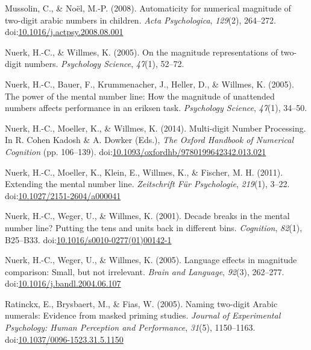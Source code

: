 \documentclass[english,man]{apa6}
\theoremstyle{definition}
\theoremstyle{definition}
\theoremstyle{definition}
\theoremstyle{remark}
\begin{document}
\hypertarget{ref-mussolin2008}{}
Mussolin, C., \& Noël, M.-P. (2008). Automaticity for numerical
magnitude of two-digit arabic numbers in children. \emph{Acta
Psychologica}, \emph{129}(2), 264--272.
doi:\href{https://doi.org/10.1016/j.actpsy.2008.08.001}{10.1016/j.actpsy.2008.08.001}

\hypertarget{ref-nuerk2005}{}
Nuerk, H.-C., \& Willmes, K. (2005). On the magnitude representations of
two-digit numbers. \emph{Psychology Science}, \emph{47}(1), 52--72.

\hypertarget{ref-nuerk2005power}{}
Nuerk, H.-C., Bauer, F., Krummenacher, J., Heller, D., \& Willmes, K.
(2005). The power of the mental number line: How the magnitude of
unattended numbers affects performance in an eriksen task.
\emph{Psychology Science}, \emph{47}(1), 34--50.

\hypertarget{ref-nuerk2014chapter}{}
Nuerk, H.-C., Moeller, K., \& Willmes, K. (2014). Multi-digit Number
Processing. In R. Cohen Kadosh \& A. Dowker (Eds.), \emph{The Oxford
Handbook of Numerical Cognition} (pp. 106--139).
doi:\href{https://doi.org/10.1093/oxfordhb/9780199642342.013.021}{10.1093/oxfordhb/9780199642342.013.021}

\hypertarget{ref-nuerk2011}{}
Nuerk, H.-C., Moeller, K., Klein, E., Willmes, K., \& Fischer, M. H.
(2011). Extending the mental number line. \emph{Zeitschrift Für
Psychologie}, \emph{219}(1), 3--22.
doi:\href{https://doi.org/10.1027/2151-2604/a000041}{10.1027/2151-2604/a000041}

\hypertarget{ref-nuerk2001}{}
Nuerk, H.-C., Weger, U., \& Willmes, K. (2001). Decade breaks in the
mental number line? Putting the tens and units back in different bins.
\emph{Cognition}, \emph{82}(1), B25--B33.
doi:\href{https://doi.org/10.1016/s0010-0277(01)00142-1}{10.1016/s0010-0277(01)00142-1}

\hypertarget{ref-nuerk2005language}{}
Nuerk, H.-C., Weger, U., \& Willmes, K. (2005). Language effects in
magnitude comparison: Small, but not irrelevant. \emph{Brain and
Language}, \emph{92}(3), 262--277.
doi:\href{https://doi.org/10.1016/j.bandl.2004.06.107}{10.1016/j.bandl.2004.06.107}

\hypertarget{ref-ratinckx2005}{}
Ratinckx, E., Brysbaert, M., \& Fias, W. (2005). Naming two-digit Arabic
numerals: Evidence from masked priming studies. \emph{Journal of
Experimental Psychology: Human Perception and Performance},
\emph{31}(5), 1150--1163.
doi:\href{https://doi.org/10.1037/0096-1523.31.5.1150}{10.1037/0096-1523.31.5.1150}
\end{document}
